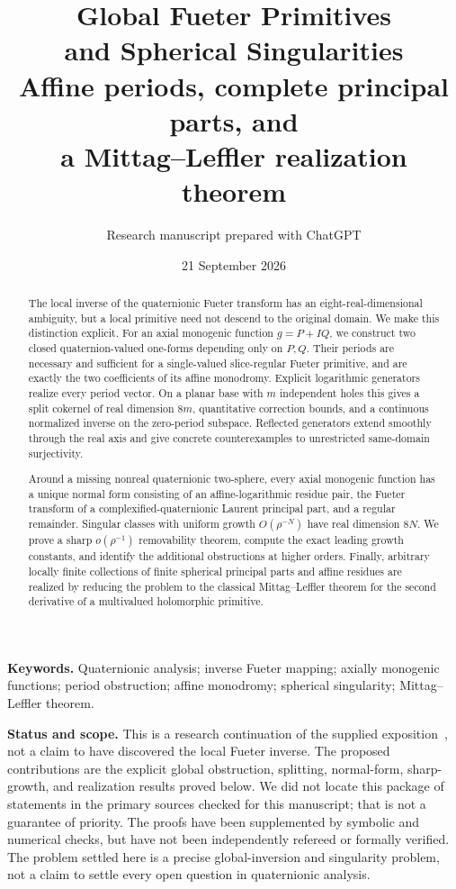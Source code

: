 \documentclass[11pt,a4paper]{article}
\title{\vspace{-10mm}\textbf{Global Fueter Primitives\\and Spherical Singularities}\\[6pt]
\large Affine periods, complete principal parts, and\\a Mittag--Leffler realization theorem}
\author{Research manuscript prepared with ChatGPT}
\date{21 September 2026}
\numberwithin{equation}{section}
\theoremstyle{definition}
\theoremstyle{remark}
\begin{document}
\maketitle
\thispagestyle{empty}
\begin{abstract}
The local inverse of the quaternionic Fueter transform has an eight-real-dimensional
ambiguity, but a local primitive need not descend to the original domain. We make
this distinction explicit. For an axial monogenic function $g=P+IQ$, we construct
two closed quaternion-valued one-forms depending only on $P,Q$. Their periods are
necessary and sufficient for a single-valued slice-regular Fueter primitive, and
are exactly the two coefficients of its affine monodromy. Explicit logarithmic
generators realize every period vector. On a planar base with $m$ independent
holes this gives a split cokernel of real dimension $8m$, quantitative correction
bounds, and a continuous normalized inverse on the zero-period subspace. Reflected
generators extend smoothly through the real axis and give concrete counterexamples
to unrestricted same-domain surjectivity.

Around a missing nonreal quaternionic two-sphere, every axial monogenic function
has a unique normal form consisting of an affine-logarithmic residue pair, the
Fueter transform of a complexified-quaternionic Laurent principal part, and a
regular remainder. Singular classes with uniform growth $O(\rho^{-N})$ have real
dimension $8N$. We prove a sharp $o(\rho^{-1})$ removability theorem, compute the
exact leading growth constants, and identify the additional obstructions at
higher orders. Finally, arbitrary locally finite collections of finite spherical
principal parts and affine residues are realized by reducing the problem to the
classical Mittag--Leffler theorem for the second derivative of a multivalued
holomorphic primitive.
\end{abstract}
\noindent\textbf{Keywords.} Quaternionic analysis; inverse Fueter mapping;
axially monogenic functions; period obstruction; affine monodromy;
spherical singularity; Mittag--Leffler theorem.

\medskip
\noindent\textbf{Status and scope.} This is a research continuation of the supplied
exposition~\cite{Source}, not a claim to have discovered the local Fueter inverse.
The proposed contributions are the explicit global obstruction, splitting,
normal-form, sharp-growth, and realization results proved below. We did not locate
this package of statements in the primary sources checked for this manuscript;
that is not a guarantee of priority. The proofs have been supplemented by symbolic
and numerical checks, but have not been independently refereed or formally verified.
The problem settled here is a precise global-inversion and singularity problem,
not a claim to settle every open question in quaternionic analysis.
\newpage
\begingroup
\small
\makeatletter
\patchcmd{\l@section}{1.0em}{0.55em}{}{}
\makeatother
\tableofcontents
\endgroup
\newpage
\end{document}
